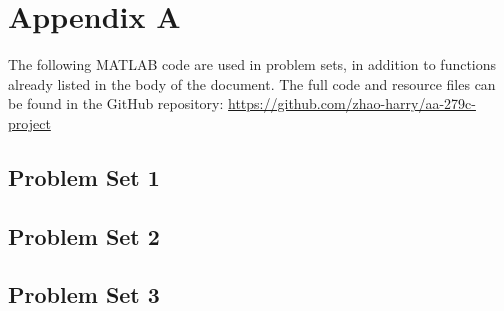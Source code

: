 \appendix

\section{Appendix A}
The following MATLAB code are used in problem sets, in addition to functions already listed in the body of the document. The full code and resource files can be found in the GitHub repository: \url{https://github.com/zhao-harry/aa-279c-project}

\subsection{Problem Set 1}


\subsection{Problem Set 2}








\subsection{Problem Set 3}


